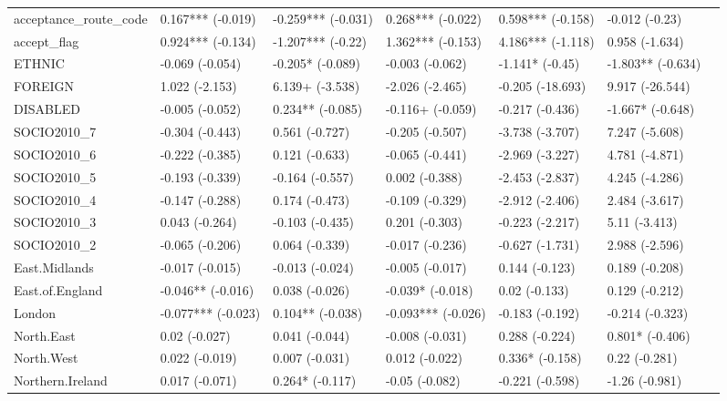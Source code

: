 \begin{longtable}{lllllll}
acceptance\_route\_code & 0.167*** 
 (-0.019) & -0.259*** 
 (-0.031) & 0.268*** 
 (-0.022) & 0.598*** 
 (-0.158) & -0.012 
 (-0.23) \\
accept\_flag & 0.924*** 
 (-0.134) & -1.207*** 
 (-0.22) & 1.362*** 
 (-0.153) & 4.186*** 
 (-1.118) & 0.958 
 (-1.634) \\
ETHNIC & -0.069 
 (-0.054) & -0.205* 
 (-0.089) & -0.003 
 (-0.062) & -1.141* 
 (-0.45) & -1.803** 
 (-0.634) \\
FOREIGN & 1.022 
 (-2.153) & 6.139+ 
 (-3.538) & -2.026 
 (-2.465) & -0.205 
 (-18.693) & 9.917 
 (-26.544) \\
DISABLED & -0.005 
 (-0.052) & 0.234** 
 (-0.085) & -0.116+ 
 (-0.059) & -0.217 
 (-0.436) & -1.667* 
 (-0.648) \\
SOCIO2010\_7 & -0.304 
 (-0.443) & 0.561 
 (-0.727) & -0.205 
 (-0.507) & -3.738 
 (-3.707) & 7.247 
 (-5.608) \\
SOCIO2010\_6 & -0.222 
 (-0.385) & 0.121 
 (-0.633) & -0.065 
 (-0.441) & -2.969 
 (-3.227) & 4.781 
 (-4.871) \\
SOCIO2010\_5 & -0.193 
 (-0.339) & -0.164 
 (-0.557) & 0.002 
 (-0.388) & -2.453 
 (-2.837) & 4.245 
 (-4.286) \\
SOCIO2010\_4 & -0.147 
 (-0.288) & 0.174 
 (-0.473) & -0.109 
 (-0.329) & -2.912 
 (-2.406) & 2.484 
 (-3.617) \\
SOCIO2010\_3 & 0.043 
 (-0.264) & -0.103 
 (-0.435) & 0.201 
 (-0.303) & -0.223 
 (-2.217) & 5.11 
 (-3.413) \\
SOCIO2010\_2 & -0.065 
 (-0.206) & 0.064 
 (-0.339) & -0.017 
 (-0.236) & -0.627 
 (-1.731) & 2.988 
 (-2.596) \\
East.Midlands & -0.017 
 (-0.015) & -0.013 
 (-0.024) & -0.005 
 (-0.017) & 0.144 
 (-0.123) & 0.189 
 (-0.208) \\
East.of.England & -0.046** 
 (-0.016) & 0.038 
 (-0.026) & -0.039* 
 (-0.018) & 0.02 
 (-0.133) & 0.129 
 (-0.212) \\
London & -0.077*** 
 (-0.023) & 0.104** 
 (-0.038) & -0.093*** 
 (-0.026) & -0.183 
 (-0.192) & -0.214 
 (-0.323) \\
North.East & 0.02 
 (-0.027) & 0.041 
 (-0.044) & -0.008 
 (-0.031) & 0.288 
 (-0.224) & 0.801* 
 (-0.406) \\
North.West & 0.022 
 (-0.019) & 0.007 
 (-0.031) & 0.012 
 (-0.022) & 0.336* 
 (-0.158) & 0.22 
 (-0.281) \\
Northern.Ireland & 0.017 
 (-0.071) & 0.264* 
 (-0.117) & -0.05 
 (-0.082) & -0.221 
 (-0.598) & -1.26 
 (-0.981) \\

\end{longtable}
